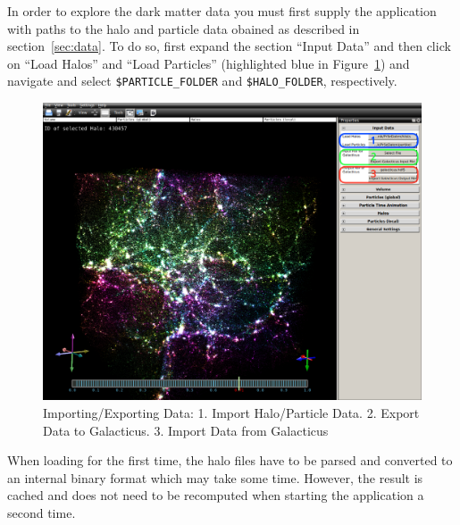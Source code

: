 \documentclass[
    fontsize=12pt,
    paper=a4,
    pagesize=auto,
    parskip=false,
    titlepage=on,
    english
]{scrartcl}
\newcommand{\inlinecode}{\texttt}
\begin{document}
In order to explore the dark matter data you must first supply the application with paths to the halo and particle data obained as described in section~\ref{sec:data}.
To do so, first expand the section ``Input Data'' and then click on ``Load Halos'' and ``Load Particles'' (highlighted blue in Figure~\ref{fig:loadinstructions}) and navigate and select \inlinecode{\$PARTICLE\_FOLDER} and \inlinecode{\$HALO\_FOLDER}, respectively.
\begin{figure}[h]
    \label{fig:loadinstructions}
    \includegraphics[width=1.0\textwidth]{images/loadinstructions.png}
        \caption{Importing/Exporting Data: 1. Import Halo/Particle Data. 2. Export Data to Galacticus. 3. Import Data from Galacticus}
\end{figure}
When loading for the first time, the halo files have to be parsed and converted to an internal binary format which may take some time.
However, the result is cached and does not need to be recomputed when starting the application a second time.
\end{document}
